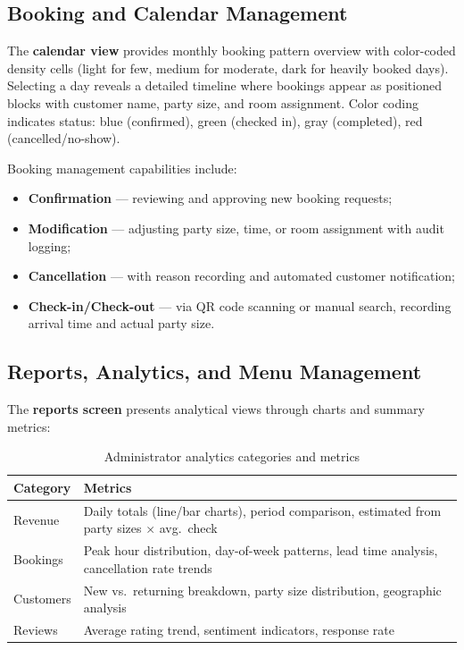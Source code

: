 \subsection{Booking and Calendar Management}
\label{subsec:booking-mgmt}

The \textbf{calendar view} provides monthly booking pattern overview with color-coded density cells (light for few, medium for moderate, dark for heavily booked days).
Selecting a day reveals a detailed timeline where bookings appear as positioned blocks with customer name, party size, and room assignment.
Color coding indicates status: blue (confirmed), green (checked in), gray (completed), red (cancelled/no-show).

Booking management capabilities include:
\begin{itemize}
  \item \textbf{Confirmation} --- reviewing and approving new booking requests;
  \item \textbf{Modification} --- adjusting party size, time, or room assignment with audit logging;
  \item \textbf{Cancellation} --- with reason recording and automated customer notification;
  \item \textbf{Check-in/Check-out} --- via QR code scanning or manual search, recording arrival time and actual party size.
\end{itemize}

\subsection{Reports, Analytics, and Menu Management}
\label{subsec:reports-menu}

The \textbf{reports screen} presents analytical views through charts and summary metrics:

\begin{table}[htbp]
\caption{Administrator analytics categories and metrics}
\label{tab:admin-analytics}
\centering
\small
\begin{tabular}{lp{8cm}}
\toprule
\textbf{Category} & \textbf{Metrics} \\
\midrule
Revenue      & Daily totals (line/bar charts), period comparison, estimated from party sizes $\times$ avg.\ check \\
Bookings     & Peak hour distribution, day-of-week patterns, lead time analysis, cancellation rate trends \\
Customers    & New vs.\ returning breakdown, party size distribution, geographic analysis \\
Reviews      & Average rating trend, sentiment indicators, response rate \\
\bottomrule
\end{tabular}
\end{table}

